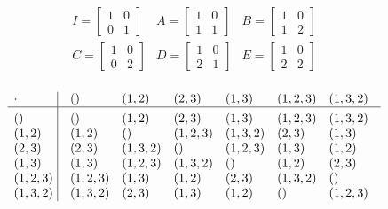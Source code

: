 \begin{mdframed}[style=darkAnswer,frametitle={Joe Starr}]
$$\begin{matrix}
  I=\begin{bmatrix}
    1 & 0 \\ 0 & 1 
  \end{bmatrix} & 
  A=\begin{bmatrix}
    1 & 0 \\ 1 & 1 
  \end{bmatrix} &
  B=\begin{bmatrix}
    1 & 0 \\ 1 & 2 
  \end{bmatrix} \\
  C=\begin{bmatrix}
    1 & 0 \\ 0 & 2 
  \end{bmatrix} & 
  D=\begin{bmatrix}
    1 & 0 \\ 2 & 1 
  \end{bmatrix} &
  E=\begin{bmatrix}
    1 & 0 \\ 2 & 2 
  \end{bmatrix} \\
\end{matrix}$$
\end{mdframed}
$$\vbox{\tabskip0.5em\offinterlineskip
      \halign{\strut$#$\hfil\ \tabskip1em\vrule&&$#$\hfil\cr
          \cdot        & \lrp{}       & \lrp{1,2}   & \lrp{2,3}   & \lrp{1,3}   & \lrp{1,2,3}  & \lrp{1,3,2}  \cr
          \noalign{\hrule}\vrule height 12pt width 0pt
          \lrp{}       & \lrp{}       & \lrp{1,2}   & \lrp{2,3}   & \lrp{1,3}   & \lrp{1,2,3}  & \lrp{1,3,2} \cr
          \lrp{1,2}    & \lrp{1,2}    & \lrp{}      & \lrp{1,2,3} & \lrp{1,3,2} & \lrp{2,3}    & \lrp{1,3} \cr
          \lrp{2,3}    & \lrp{2,3}    & \lrp{1,3,2} & \lrp{}      & \lrp{1,2,3} & \lrp{1,3}    & \lrp{1,2} \cr
          \lrp{1,3}    & \lrp{1,3}    & \lrp{1,2,3} & \lrp{1,3,2} & \lrp{}      & \lrp{1,2}    & \lrp{2,3} \cr
          \lrp{1,2,3}  & \lrp{1,2,3}  & \lrp{1,3}   & \lrp{1,2}   & \lrp{2,3}   & \lrp{1,3,2}  & \lrp{}    \cr
          \lrp{1,3,2}  & \lrp{1,3,2}  & \lrp{2,3}   & \lrp{1,3}   & \lrp{1,2}   & \lrp{}       & \lrp{1,2,3} \cr
        }}$$
